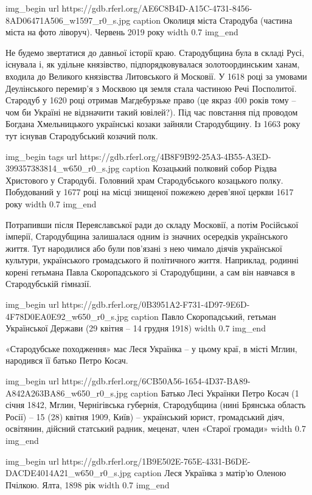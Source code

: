 \ifcmt
img_begin 
  url https://gdb.rferl.org/AE6C8B4D-A15C-4731-8456-8AD06471A506_w1597_r0_s.jpg
  caption Околиця міста Стародуба (частина міста на фото ліворуч). Червень 2019 року 
  width 0.7
img_end
\fi

Не будемо звертатися до давньої історії краю. Стародубщина була в складі Русі,
існувала і, як удільне князівство, підпорядковувалася золотоординським ханам,
входила до Великого князівства Литовського й Московії. У 1618 році за умовами
Деулінського перемир’я з Москвою ця земля стала частиною Речі Посполитої.
Стародуб у 1620 році отримав Магдебурзьке право (це якраз 400 років тому – чом
би Україні не відзначити такий ювілей?). Під час повстання під проводом Богдана
Хмельницького українські козаки зайняли Стародубщину. Із 1663 року тут існував
Стародубський козачий полк.

\ifcmt
img_begin 
  tags 
  url https://gdb.rferl.org/4B8F9B92-25A3-4B55-A3ED-399357383814_w650_r0_s.jpg
  caption Козацький полковий собор Різдва Христового у Стародубі. Головний храм
  Стародубського козацького полку. Побудований у 1677 році на місці знищеної
  пожежею дерев’яної церкви 1617 року
  width 0.7
img_end
\fi

Потрапивши після Переяславської ради до складу Московії, а потім Російської
імперії, Стародубщина залишалася одним із значних осередків українського життя.
Тут народилися або були пов’язані з нею чимало діячів української культури,
українського громадського й політичного життя. Наприклад, родинні корені
гетьмана Павла Скоропадського зі Стародубщини, а сам він навчався в
Стародубській гімназії.

\ifcmt
img_begin 
  url https://gdb.rferl.org/0B3951A2-F731-4D97-9E6D-4F78D0EA0E92_w650_r0_s.jpg
  caption Павло Скоропадський, гетьман Української Держави (29 квітня – 14 грудня 1918)
  width 0.7
img_end
\fi

«Стародубське походження» має Леся Українка – у цьому краї, в місті Мглин,
народився її батько Петро Косач.

\ifcmt
img_begin 
  url https://gdb.rferl.org/6CB50A56-1654-4D37-BA89-A842A263BA86_w650_r0_s.jpg
  caption Батько Лесі Українки Петро Косач (1 січня 1842, Мглин, Чернігівська
  губернія, Стародубщина (нині Брянська область Росії) – 15 (28) квітня 1909,
  Київ) – український юрист, громадський діяч, освітянин, дійсний статський
  радник, меценат, член «Старої громади»
  width 0.7
img_end
\fi

\ifcmt
img_begin 
  url https://gdb.rferl.org/1B9E502E-765E-4331-B6DE-DACDE4014A21_w650_r0_s.jpg
  caption Леся Українка з матір’ю Оленою Пчілкою. Ялта, 1898 рік
  width 0.7
img_end
\fi

